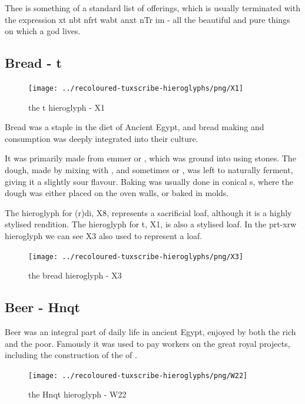 Thee is something of a standard list of offerings, which is usually terminated with the expression xt nbt nfrt wabt anxt nTr im - all the beautiful and pure things on which a god lives.

\subsection*{Bread - t}

\begin{figure} [H]
	\centering
	\texttt{[image: ../recoloured-tuxscribe-hieroglyphs/png/X1]}
	\caption{the t hieroglyph - X1}
\end{figure}

Bread was a staple in the diet of Ancient Egypt, and bread making and consumption was deeply integrated into their culture.

It was primarily made from emmer  or , which was ground into  using stones. The dough, made by mixing with , and sometimes  or , was left to naturally ferment, giving it a slightly sour flavour. Baking was usually done in conical  s, where the dough was either placed on the oven walls, or baked in molds.

The hieroglyph for (r)di, X8, represents a sacrificial loaf, although it is a highly stylised rendition. The hieroglyph for t, X1, is also a stylised loaf. In the prt-xrw hieroglyph we can see X3 also used to represent a loaf.

\begin{figure} [H]
	\centering
	\texttt{[image: ../recoloured-tuxscribe-hieroglyphs/png/X3]}
	\caption{the bread hieroglyph - X3}
\end{figure}

\subsection*{Beer - Hnqt}

Beer was an integral part of daily life in ancient Egypt, enjoyed by both the rich and the poor. Famously it was used to pay workers on the great royal projects, including the construction of the  of .

\begin{figure} [H]
	\centering
	\texttt{[image: ../recoloured-tuxscribe-hieroglyphs/png/W22]}
	\caption{the Hnqt hieroglyph - W22}
\end{figure}

